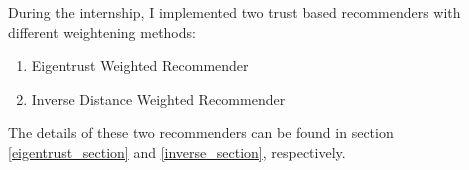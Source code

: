 	During the internship, I implemented two trust based recommenders with different weightening methods:
	\begin{enumerate}
		\item Eigentrust Weighted Recommender
		\item Inverse Distance Weighted Recommender
	\end{enumerate} 
	The details of these two recommenders can be found in section \ref{eigentrust_section} and \ref{inverse_section}, respectively.